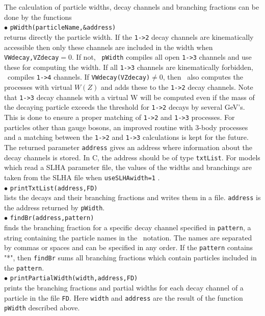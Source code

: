 \documentclass[12pt,a4paper]{article}
\begin{document}
The calculation of particle widths, decay channels  and branching fractions
can be done by the functions\\[2mm]
%
\noindent
$\bullet$ \verb|pWidth(particleName,&address)|\\
returns directly the particle width. If the  \verb|1->2| 
decay channels are kinematically accessible then only these channels are
included in the width when \verb|VWdecay,VZdecay|$ = 0$.  If not, {\tt
pWidth} compiles all open \verb|1->3| channels and use these for  computing the width.
If all \verb|1->3| channels are kinematically forbidden, \micro\ compiles \verb|1->4| channels.
If \verb|VWdecay(VZdecay)|$\ne 0$, then \micro\  also computes the processes with virtual $W(Z)$  and adds these to the \verb|1->2| decay channels.
 Note that \verb|1->3| decay channels with a virtual W  will be computed even
if the mass of the decaying particle exceeds the threshold for \verb|1->2| decays by several GeV's. This is done to ensure a 
proper matching of \verb|1->2| and \verb|1->3| processes.  For  particles other than gauge bosons,
an improved routine with 3-body processes and a matching  between
the \verb|1->2| and \verb|1->3| calculations is kept for the future. 
The returned  parameter \verb|address| 
gives  an address where information about the decay channels is stored.
In C, the address should be of type {\tt  txtList}.
For models which read a SLHA parameter file, the values of the widths and branchings are taken from the SLHA
file when \verb|useSLHAwidth=1| .\\[2mm]
%
\noindent
$\bullet$ \verb|printTxtList(address,FD)|\\
lists the decays and their branching fractions and writes them in a file.
{\tt address} is the address returned by {\tt pWidth}. \\[2mm]
%
\noindent
$\bullet$ \verb|findBr(address,pattern)|\\ 
finds the branching fraction for a specific decay channel specified in
{\tt pattern},  a string containing the particle names 
in the \calchep\ notation. The names are separated by commas or spaces and can be specified in any
order. If the  {\tt pattern} contains  "*", then {\tt findBr} sums all branching fractions
which contain particles included in the {\tt pattern}.\\[2mm]
 \noindent
 $\bullet$ \verb|printPartialWidth(width,address,FD)|\\ 
prints the branching fractions and partial widths for each decay channel of a particle in the file {\tt FD}.   Here {\tt width} and {\tt address} are the result of the function  {\tt pWidth} described above.\\[2mm]
\end{document}
